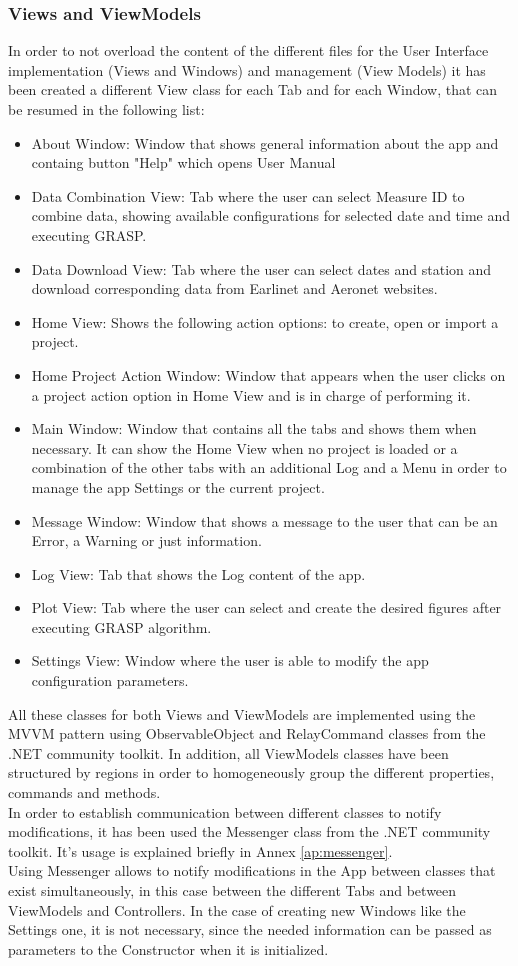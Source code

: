 \subsubsection{Views and ViewModels}
In order to not overload the content of the different files for the User Interface implementation (Views and Windows) and management (View Models) it has been created a different View class for each Tab and for each Window, that can be resumed in the following list:
\begin{itemize}
    \item About Window: Window that shows general information about the app and containg button "Help" which opens User Manual
    \item Data Combination View: Tab where the user can select Measure ID to combine data, showing available configurations for selected date and time and executing GRASP.
    \item Data Download View: Tab where the user can select dates and station and download corresponding data from Earlinet and Aeronet websites.
    \item Home View: Shows the following action options: to create, open or import a project.
    \item Home Project Action Window: Window that appears when the user clicks on a project action option in Home View and is in charge of performing it.
    \item Main Window: Window that contains all the tabs and shows them when necessary. It can show the Home View when no project is loaded or a combination of the other tabs with an additional Log and a Menu in order to manage the app Settings or the current project.
    \item Message Window: Window that shows a message to the user that can be an Error, a Warning or just information.
    \item Log View: Tab that shows the Log content of the app.
    \item Plot View: Tab where the user can select and create the desired figures after executing GRASP algorithm.
    \item Settings View: Window where the user is able to modify the app configuration parameters.
\end{itemize}
All these classes for both Views and ViewModels are implemented using the MVVM pattern using ObservableObject and RelayCommand classes from the .NET community toolkit. In addition, all ViewModels classes have been structured by regions in order to homogeneously group the different properties, commands and methods.\smallskip\\
In order to establish communication between different classes to notify modifications, it has been used the Messenger class from the .NET community toolkit. It's usage is explained briefly in Annex \ref{ap:messenger}. 
\smallskip\\Using Messenger allows to notify modifications in the App between classes that exist simultaneously, in this case between the different Tabs and between ViewModels and Controllers. In the case of creating new Windows like the Settings one, it is not necessary, since the needed information can be passed as parameters to the Constructor when it is initialized.
